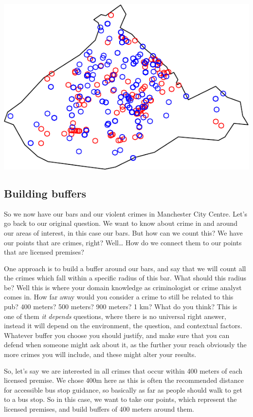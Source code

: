 \documentclass[
  krantz2]{krantz}
\begin{document}
\includegraphics{crime_mapping_files/figure-latex/plot_bars_crimes-1.pdf}

\hypertarget{building-buffers}{%
\subsection{Building buffers}\label{building-buffers}}

So we now have our bars and our violent crimes in Manchester City Centre. Let's go back to our original question. We want to know about crime in and around our areas of interest, in this case our bars. But how can we count this? We have our points that are crimes, right? Well\ldots{} How do we connect them to our points that are licensed premises?

One approach is to build a buffer around our bars, and say that we will count all the crimes which fall within a specific radius of this bar. What should this radius be? Well this is where your domain knowledge as criminologist or crime analyst comes in. How far away would you consider a crime to still be related to this pub? 400 meters? 500 meters? 900 meters? 1 km? What do you think? This is one of them \emph{it depends} questions, where there is no universal right answer, instead it will depend on the environment, the question, and contextual factors. Whatever buffer you choose you should justify, and make sure that you can defend when someone might ask about it, as the further your reach obviously the more crimes you will include, and these might alter your results.

So, let's say we are interested in all crimes that occur within 400 meters of each licensed premise. We chose 400m here as this is often the recommended distance for accessible bus stop guidance, so basically as far as people should walk to get to a bus stop. So in this case, we want to take our points, which represent the licensed premises, and build buffers of 400 meters around them.
\end{document}
